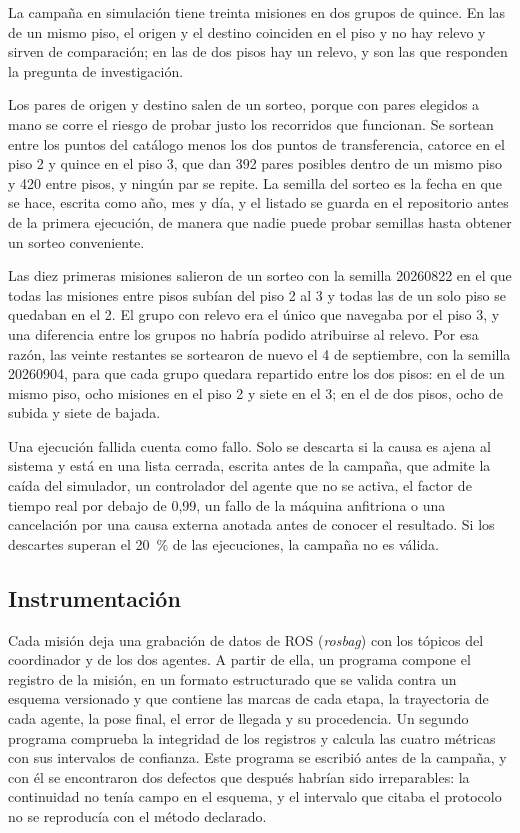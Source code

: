 La campaña en simulación tiene treinta misiones en dos grupos de quince. En las de un mismo piso, el origen y el destino coinciden en el piso y no hay relevo y sirven de comparación; en las de dos pisos hay un
relevo, y son las que responden la pregunta de investigación.

Los pares de origen y destino salen de un sorteo, porque con pares elegidos a mano se corre el riesgo de probar justo los recorridos que funcionan. Se sortean entre los puntos del catálogo menos los dos puntos de transferencia, catorce
en el piso 2 y quince en el piso 3, que dan 392 pares posibles dentro de un mismo piso y 420 entre pisos, y ningún par se repite. La semilla del sorteo es la fecha en que se hace, escrita como año, mes y día, y el listado se guarda en
el repositorio antes de la primera ejecución, de manera que nadie puede probar semillas hasta obtener un sorteo conveniente.

Las diez primeras misiones salieron de un sorteo con la semilla 20260822 en el que todas las misiones entre pisos subían del piso 2 al 3 y todas las de un solo piso se quedaban en el 2. El grupo con relevo era el único que navegaba por
el piso 3, y una diferencia entre los grupos no habría podido atribuirse al relevo. Por esa razón, las veinte restantes se sortearon de nuevo el 4 de septiembre, con la semilla 20260904, para que cada grupo quedara repartido
entre los dos pisos: en el de un mismo piso, ocho misiones en el piso 2 y siete en el 3; en el de dos pisos, ocho de subida y siete de bajada.

Una ejecución fallida cuenta como fallo. Solo se descarta si la causa es ajena al sistema y está en una lista cerrada, escrita antes de la campaña, que admite la caída del simulador, un controlador del agente que no se activa, el factor
de tiempo real por debajo de 0,99, un fallo de la máquina anfitriona o una cancelación por una causa externa anotada antes de conocer el resultado. Si los descartes superan el 20~\% de las ejecuciones, la campaña no es válida.

\subsection{Instrumentación}
\label{sec:instrumentacion}

Cada misión deja una grabación de datos de ROS (\textit{rosbag}) con los tópicos del coordinador y de los dos agentes. A partir de ella, un programa compone el registro de la misión, en un formato estructurado que se valida contra un
esquema versionado y que contiene las marcas de cada etapa, la trayectoria de cada agente, la pose final, el error de llegada y su procedencia. Un segundo programa comprueba la integridad de los registros y calcula las cuatro métricas con
sus intervalos de confianza. Este programa se escribió antes de la campaña, y con él se encontraron dos defectos que después habrían sido irreparables: la continuidad no tenía campo en el esquema, y el intervalo que citaba el protocolo no
se reproducía con el método declarado.

